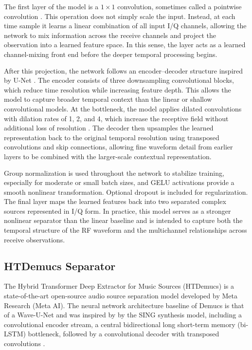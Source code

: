 \documentclass[conference]{IEEEtran}
\begin{document}
    The first layer of the model is a $1 \times 1$ convolution, sometimes called a pointwise convolution \cite{lin2013nin}. This operation does not simply scale the input. Instead, at each time sample it learns a linear combination of all input I/Q channels, allowing the network to mix information across the receive channels and project the observation into a learned feature space. In this sense, the layer acts as a learned channel-mixing front end before the deeper temporal processing begins.
    
    After this projection, the network follows an encoder--decoder structure inspired by U-Net \cite{ronneberger2015unet}. The encoder consists of three downsampling convolutional blocks, which reduce time resolution while increasing feature depth. This allows the model to capture broader temporal context than the linear or shallow convolutional models. At the bottleneck, the model applies dilated convolutions with dilation rates of 1, 2, and 4, which increase the receptive field without additional loss of resolution \cite{yu2015dilated}. The decoder then upsamples the learned representation back to the original temporal resolution using transposed convolutions and skip connections, allowing fine waveform detail from earlier layers to be combined with the larger-scale contextual representation.
    
    Group normalization \cite{wu2018groupnorm} is used throughout the network to stabilize training, especially for moderate or small batch sizes, and GELU activations \cite{gelu} provide a smooth nonlinear transformation. Optional dropout is included for regularization. The final layer maps the learned features back into two separated complex sources represented in I/Q form. In practice, this model serves as a stronger nonlinear separator than the linear baseline and is intended to capture both the temporal structure of the RF waveform and the multichannel relationships across receive observations.
    

    
\subsection{HTDemucs Separator}
    The Hybrid Transformer Deep Extractor for Music Sources (HTDemucs) is a state-of-the-art open-source audio source separation model developed by Meta Research (Meta AI). The neural network architecture baseline of Demucs is that of a Wave-U-Net and was inspired by by the SING synthesis model, including a convolutional encoder stream, a central bidirectional long short-term memory (bi-LSTM) bottleneck, followed by a convolutional decoder with transposed convolutions \cite{defossez2019demucs}.\\
\end{document}
